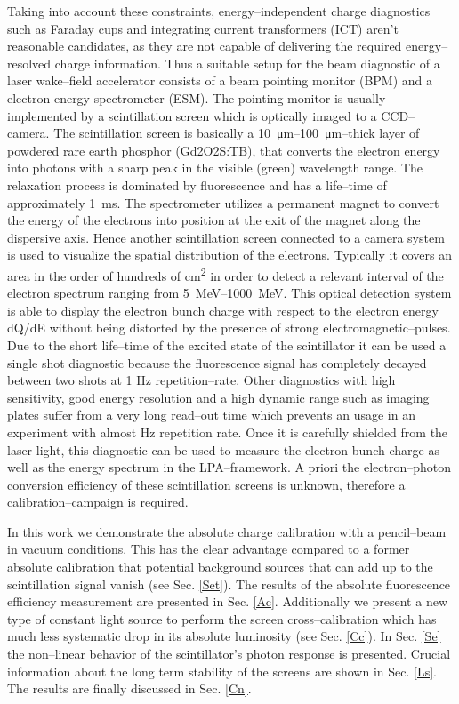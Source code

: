 \documentclass[%
reprint,
amsmath,
amssymb,
aip,
rsi, 
numerical,
floatfix,
]{revtex4-1}
\newcommand{\myCite}[1]{\textcolor{blue}{\cite{#1}}}
\begin{document}
Taking into account these constraints, energy--independent charge diagnostics such as Faraday cups and integrating current transformers (ICT) aren't reasonable candidates, as they are not capable of delivering the required energy--resolved charge information.
Thus a suitable setup for the beam diagnostic of a laser wake--field accelerator consists of a beam pointing monitor (BPM) and a electron energy spectrometer (ESM). 
The pointing monitor is usually implemented by a scintillation screen which is optically imaged to a CCD--camera. 
The scintillation screen is basically a \SIrange{10}{100}{\micro\meter}--thick layer of powdered rare earth phosphor (Gd2O2S:TB), that converts the electron energy into photons with a sharp peak in the visible (green) wavelength range.
The relaxation process is dominated by fluorescence and has a life--time of approximately \SI{1}{\milli\second}.
The spectrometer utilizes a permanent magnet to convert the energy of the electrons into position at the exit of the magnet along the dispersive axis. 
Hence another scintillation screen connected to a camera system is used to visualize the spatial distribution of the electrons.
Typically it covers an area in the order of hundreds of \si{\centi\metre^2} in order to detect a relevant interval of the electron spectrum ranging from \SIrange{5}{1000}{\mega\electronvolt}. 
This optical detection system is able to display the electron bunch charge with respect to the electron energy \si[per-mode=symbol]{dQ\per dE} without being distorted by the presence of strong electromagnetic--pulses. 
Due to the short life--time of the excited state of the scintillator it can be used a single shot diagnostic because the fluorescence signal has completely decayed between two shots at 1 Hz repetition--rate. 
Other diagnostics with high sensitivity, good energy resolution and a high dynamic range such as imaging plates\myCite{Tanaka2005,Masuda2008,Zeil2010,Bonnet2013} suffer from a very long read--out time which prevents an usage in an experiment with almost Hz repetition rate.
Once it is carefully shielded from the laser light, this diagnostic can be used to measure the electron bunch charge as well as the energy spectrum in the LPA--framework. 
A priori the electron--photon conversion efficiency of these scintillation screens is unknown, therefore a calibration--campaign is required.

In this work we demonstrate the absolute charge calibration with a pencil--beam in vacuum conditions.
This has the clear advantage compared to a former absolute calibration\myCite{Buck2010} that potential background sources that can add up to the scintillation signal vanish (see Sec. \ref{Set}).
The results of the absolute fluorescence efficiency measurement are presented in Sec. \ref{Ac}.
Additionally we present a new type of constant light source to perform the screen cross--calibration which has much less systematic drop in its absolute luminosity (see Sec. \ref{Cc}).
In Sec. \ref{Se} the non--linear behavior of the scintillator's photon response is presented.
Crucial information about the long term stability of the screens are shown in Sec. \ref{Ls}. 
The results are finally discussed in Sec. \ref{Cn}.
\end{document}
